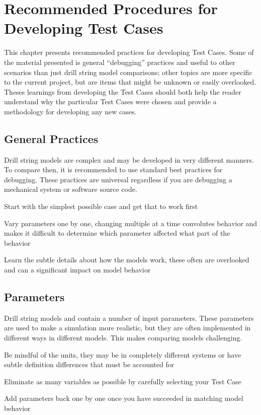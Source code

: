 \chapter{Recommended Procedures for Developing Test Cases}
\label{ch:testcaseprocedures}
This chapter presents recommended practices for developing Test Cases.  Some of the material presented is general ``debugging'' practices and useful to other scenarios than just drill string model comparisons; other topics are more specific to the current project, but are items that might be unknown or easily overlooked.  Theses learnings from developing the Test Cases should both help the reader understand why the particular Test Cases were chosen and provide a methodology for developing any new cases.

\section{General Practices}
Drill string models are complex and may be developed in very different manners.  To compare then, it is recommended to use standard best practices for debugging.  These practices are universal regardless if you are debugging a mechanical system or software source code.
\begin{bulletedlist}
	\item Start with the simplest possible case and get that to work first
	\item Vary parameters one by one, changing multiple at a time convolutes behavior and makes it difficult to determine which parameter affected what part of the behavior
    \item Learn the subtle details about how the models work, these often are overlooked and can a significant impact on model behavior
\end{bulletedlist}

\section{Parameters}
Drill string models and contain a number of input parameters.  These parameters are used to make a simulation more realistic, but they are often implemented in different ways in different models.  This makes comparing models challenging.
\begin{numberedlist}
	\item Be mindful of the units, they may be in completely different systems or have subtle definition differences that must be accounted for
	\item Eliminate as many variables as possible by carefully selecting your Test Case
	\item Add parameters back one by one once you have succeeded in matching model behavior
\end{numberedlist}

